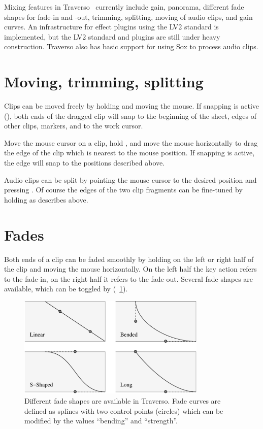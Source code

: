 Mixing features in Traverso \Version\ currently include gain, panorama, different fade shapes for fade-in and -out, trimming, splitting, moving of audio clips, and gain curves. An infrastructure for effect plugins using the LV2 standard is implemented, but  the LV2 standard and plugins are still under heavy construction. Traverso also has basic support for using Sox to process audio clips.

\section{Moving, trimming, splitting}
Clips can be moved freely by holding  and moving the mouse. If snapping is active (), both ends of the dragged clip will snap to the beginning of the sheet, edges of other clips, markers, and to the work cursor.

Move the mouse cursor on a clip, hold , and move the mouse horizontally to drag the edge of the clip which is nearest to the mouse position. If snapping is active, the edge will snap to the positions described above.

Audio clips can be split by pointing the mouse cursor to the desired position and pressing . Of course the edges of the two clip fragments can be fine-tuned by holding  as describes above.

\section{Fades}
Both ends of a clip can be faded smoothly by holding  on the left or right half of the clip and moving the mouse horizontally. On the left half the key action refers to the fade-in, on the right half it refers to the fade-out. Several fade shapes are available, which can be toggled by  (\FigB~\ref{fig_fades01}).

\begin{figure}[t]
 \centering\includegraphics[width=0.8\textwidth]{images/fades}
 \caption{Different fade shapes are available in Traverso. Fade curves are defined as splines with two control points (circles) which can be modified by the values ``bending'' and ``strength''.}
 \label{fig_fades01}
\end{figure}

